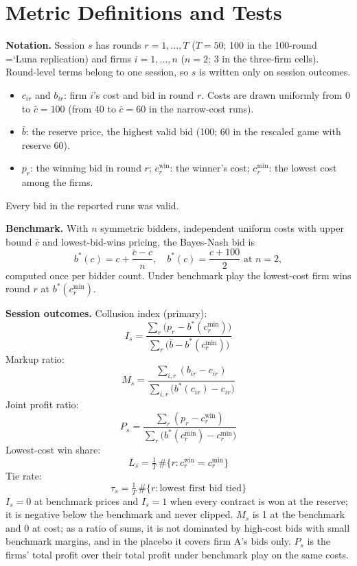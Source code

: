 \documentclass[11pt]{article}
\newcommand{\model}[1]{{\ttfamily\hyphenchar\font=`\-\relax #1}}
\newcommand{\LU}{\model{Luna}}
\newcommand{\para}[1]{\textbf{#1}\hspace{0.4em}}
\begin{document}
\appendix
\section{Metric Definitions and Tests}
\label{app:metrics}

\para{Notation.} Session $s$ has rounds $r = 1, \dots, T$ ($T = 50$; 100 in the 100-round \LU{} replication) and firms $i = 1, \dots, n$ ($n = 2$; 3 in the three-firm cells). Round-level terms belong to one session, so $s$ is written only on session outcomes.
\begin{itemize}[leftmargin=1.5em,itemsep=0pt,topsep=2pt]
\item $c_{ir}$ and $b_{ir}$: firm $i$'s cost and bid in round $r$. Costs are drawn uniformly from 0 to $\bar c = 100$ (from 40 to $\bar c = 60$ in the narrow-cost runs).
\item $\bar b$: the reserve price, the highest valid bid (100; 60 in the rescaled game with reserve 60).
\item $p_r$: the winning bid in round $r$; $c^{\text{win}}_r$: the winner's cost; $c^{\min}_r$: the lowest cost among the firms.
\end{itemize}
Every bid in the reported runs was valid.

\para{Benchmark.} With $n$ symmetric bidders, independent uniform costs with upper bound $\bar c$ and lowest-bid-wins pricing, the Bayes-Nash bid is
\[
b^*(c) = c + \frac{\bar c - c}{n}, \quad b^*(c) = \frac{c + 100}{2} \text{ at } n = 2,
\]
computed once per bidder count. Under benchmark play the lowest-cost firm wins round $r$ at $b^*(c^{\min}_r)$.

\para{Session outcomes.}
Collusion index (primary):
\[I_s = \frac{\sum_r \big(p_r - b^*(c^{\min}_r)\big)}{\sum_r \big(\bar b - b^*(c^{\min}_r)\big)}\]
Markup ratio:
\[M_s = \frac{\sum_{i,r} (b_{ir} - c_{ir})}{\sum_{i,r} \big(b^*(c_{ir}) - c_{ir}\big)}\]
Joint profit ratio:
\[P_s = \frac{\sum_r (p_r - c^{\text{win}}_r)}{\sum_r \big(b^*(c^{\min}_r) - c^{\min}_r\big)}\]
Lowest-cost win share:
\[L_s = \tfrac{1}{T}\,\#\{r : c^{\text{win}}_r = c^{\min}_r\}\]
Tie rate:
\[\tau_s = \tfrac{1}{T}\,\#\{r : \text{lowest first bid tied}\}\]
$I_s = 0$ at benchmark prices and $I_s = 1$ when every contract is won at the reserve; it is negative below the benchmark and never clipped. $M_s$ is 1 at the benchmark and 0 at cost; as a ratio of sums, it is not dominated by high-cost bids with small benchmark margins, and in the placebo it covers firm A's bids only. $P_s$ is the firms' total profit over their total profit under benchmark play on the same costs.
\end{document}
